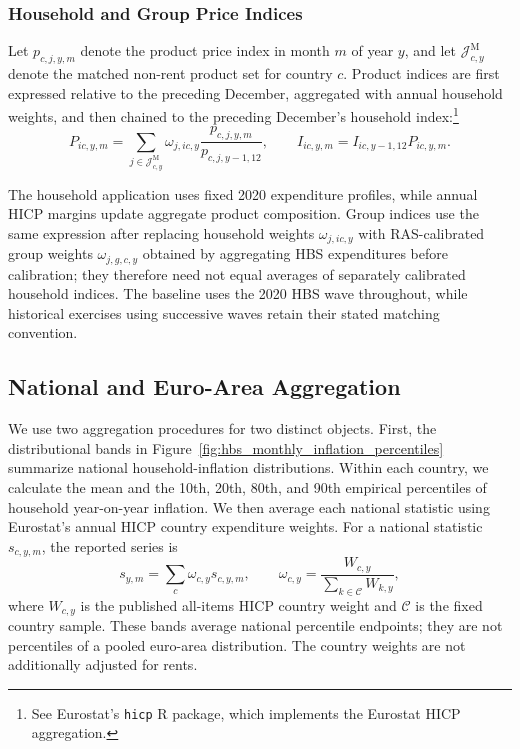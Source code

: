 \documentclass[11pt]{article}
\begin{document}
\subsubsection*{Household and Group Price Indices}

Let $p_{c,j,y,m}$ denote the product price index in month $m$ of year $y$, and let
$\mathcal J_{c,y}^{\mathrm M}$ denote the matched non-rent product set for country $c$. Product indices are first
expressed relative to the preceding December, aggregated with annual household weights, and then
chained to the preceding December's household index:\footnote{See Eurostat's \texttt{hicp} R
package, which implements the Eurostat HICP aggregation.}
\begin{equation}
P_{ic,y,m}
=\sum_{j\in\mathcal J_{c,y}^{\mathrm M}}\omega_{j,ic,y}
\frac{p_{c,j,y,m}}{p_{c,j,y-1,12}},
\qquad
I_{ic,y,m}=I_{ic,y-1,12}P_{ic,y,m}.
\label{eq:household-within-year-price-index}
\end{equation}

The household application uses fixed 2020 expenditure profiles, while annual HICP margins update
aggregate product composition. Group indices use the same expression after replacing household
weights $\omega_{j,ic,y}$ with RAS-calibrated group weights $\omega_{j,g,c,y}$ obtained by aggregating
HBS expenditures before calibration; they therefore need not equal averages of separately calibrated
household indices. The baseline uses the 2020 HBS wave throughout, while historical exercises using
successive waves retain their stated matching convention.

\subsection{National and Euro-Area Aggregation}

We use two aggregation procedures for two distinct objects. First, the distributional bands in
Figure~\ref{fig:hbs_monthly_inflation_percentiles} summarize national household-inflation
distributions. Within each country, we calculate the mean and the 10th, 20th, 80th,
and 90th empirical percentiles of household year-on-year inflation. We then average each national
statistic using Eurostat's annual HICP country expenditure weights. For a national statistic
$s_{c,y,m}$, the reported series is
\begin{equation}
s_{y,m}=\sum_c\omega_{c,y}s_{c,y,m},
\qquad
\omega_{c,y}=\frac{W_{c,y}}{\sum_{k\in\mathcal C}W_{k,y}},
\label{eq:national-statistic-aggregation}
\end{equation}
where $W_{c,y}$ is the published all-items HICP country weight and $\mathcal C$ is the fixed country
sample. These bands average national percentile endpoints; they are not percentiles of a pooled
euro-area distribution. The country weights are not additionally adjusted for rents.
\end{document}
